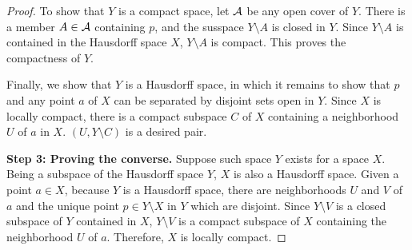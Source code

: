 \begin{proof}
    To show that $Y$ is a compact space, let ${\mathcal{A}}$ be any open cover of $Y$.
    There is a member $A\in{\mathcal{A}}$ containing $p$, and the susspace $Y\setminus A$ is closed in $Y$.
    Since $Y\setminus A$ is contained in the Hausdorff space $X$, $Y\setminus A$ is compact.
    This proves the compactness of $Y$.

    Finally, we show that $Y$ is a Hausdorff space, in which it remains to show that $p$ and any point $a$ of $X$ can be separated by disjoint sets open in $Y$.
    Since $X$ is locally compact, there is a compact subspace $C$ of $X$ containing a neighborhood $U$ of $a$ in $X$.
    $(U, Y\setminus C)$ is a desired pair.

    \textbf{Step 3: Proving the converse.}\newline\noindent
    Suppose such space $Y$ exists for a space $X$.
    Being a subspace of the Hausdorff space $Y$, $X$ is also a Hausdorff space.
    Given a point $a\in X$, because $Y$ is a Hausdorff space, there are neighborhoods $U$ and $V$ of $a$ and the unique point $p\in Y\setminus X$ in $Y$ which are disjoint.
    Since $Y\setminus V$ is a closed subspace of $Y$ contained in $X$, $Y\setminus V$ is a compact subspace of $X$ containing the neighborhood $U$ of $a$.
    Therefore, $X$ is locally compact.
\end{proof}

